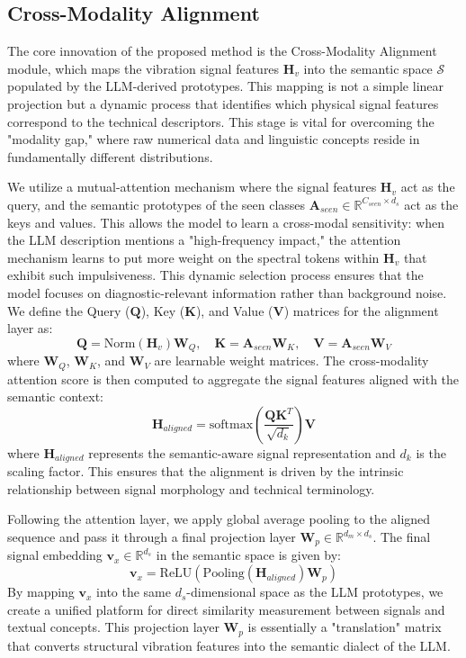 \documentclass[journal]{IEEEtran}
\begin{document}
\subsection{Cross-Modality Alignment}
The core innovation of the proposed method is the Cross-Modality Alignment module, which maps the vibration signal features $\mathbf{H}_v$ into the semantic space $\mathcal{S}$ populated by the LLM-derived prototypes. This mapping is not a simple linear projection but a dynamic process that identifies which physical signal features correspond to the technical descriptors. This stage is vital for overcoming the "modality gap," where raw numerical data and linguistic concepts reside in fundamentally different distributions.

We utilize a mutual-attention mechanism where the signal features $\mathbf{H}_v$ act as the query, and the semantic prototypes of the seen classes $\mathbf{A}_{seen} \in \mathbb{R}^{C_{seen} \times d_s}$ act as the keys and values. This allows the model to learn a cross-modal sensitivity: when the LLM description mentions a "high-frequency impact," the attention mechanism learns to put more weight on the spectral tokens within $\mathbf{H}_v$ that exhibit such impulsiveness. This dynamic selection process ensures that the model focuses on diagnostic-relevant information rather than background noise. We define the Query ($\mathbf{Q}$), Key ($\mathbf{K}$), and Value ($\mathbf{V}$) matrices for the alignment layer as:
\begin{equation}
\mathbf{Q} = \text{Norm}(\mathbf{H}_v) \mathbf{W}_Q, \quad \mathbf{K} = \mathbf{A}_{seen} \mathbf{W}_K, \quad \mathbf{V} = \mathbf{A}_{seen} \mathbf{W}_V
\end{equation}
where $\mathbf{W}_Q$, $\mathbf{W}_K$, and $\mathbf{W}_V$ are learnable weight matrices. The cross-modality attention score is then computed to aggregate the signal features aligned with the semantic context:
\begin{equation}
\mathbf{H}_{aligned} = \text{softmax}\left(\frac{\mathbf{Q}\mathbf{K}^T}{\sqrt{d_k}}\right) \mathbf{V}
\end{equation}
where $\mathbf{H}_{aligned}$ represents the semantic-aware signal representation and $d_k$ is the scaling factor. This ensures that the alignment is driven by the intrinsic relationship between signal morphology and technical terminology.

Following the attention layer, we apply global average pooling to the aligned sequence and pass it through a final projection layer $\mathbf{W}_p \in \mathbb{R}^{d_m \times d_s}$. The final signal embedding $\mathbf{v}_x \in \mathbb{R}^{d_s}$ in the semantic space is given by:
\begin{equation}
\mathbf{v}_x = \text{ReLU}(\text{Pooling}(\mathbf{H}_{aligned}) \mathbf{W}_p)
\end{equation}
By mapping $\mathbf{v}_x$ into the same $d_s$-dimensional space as the LLM prototypes, we create a unified platform for direct similarity measurement between signals and textual concepts. This projection layer $\mathbf{W}_p$ is essentially a "translation" matrix that converts structural vibration features into the semantic dialect of the LLM.
\end{document}
